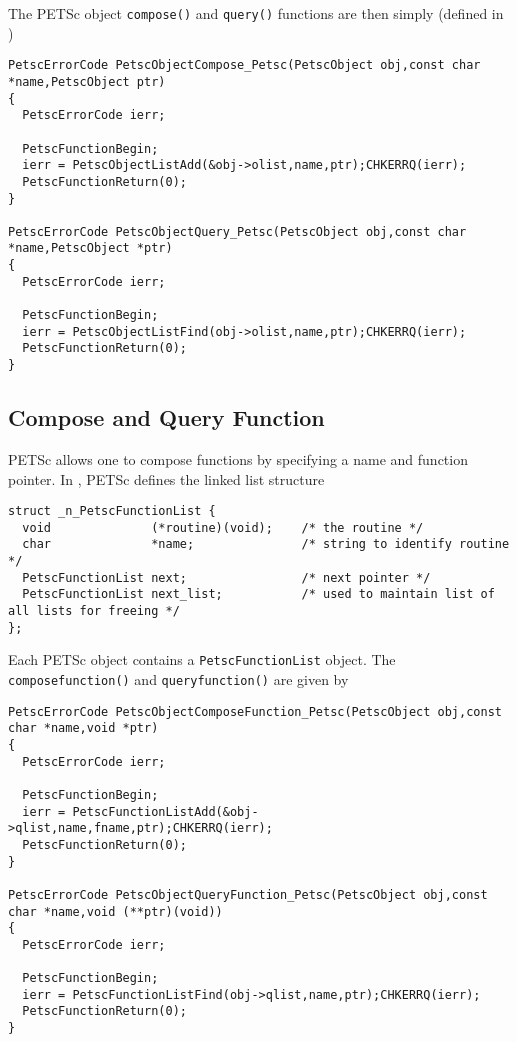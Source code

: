 The PETSc object \lstinline{compose()} and \lstinline{query()} functions are then simply
(defined in \href{http://www.mcs.anl.gov/petsc/petsc-master/src/objects/inherit.c.html}{})
\begin{lstlisting}
PetscErrorCode PetscObjectCompose_Petsc(PetscObject obj,const char *name,PetscObject ptr)
{
  PetscErrorCode ierr;

  PetscFunctionBegin;
  ierr = PetscObjectListAdd(&obj->olist,name,ptr);CHKERRQ(ierr);
  PetscFunctionReturn(0);
}

PetscErrorCode PetscObjectQuery_Petsc(PetscObject obj,const char *name,PetscObject *ptr)
{
  PetscErrorCode ierr;

  PetscFunctionBegin;
  ierr = PetscObjectListFind(obj->olist,name,ptr);CHKERRQ(ierr);
  PetscFunctionReturn(0); 
}
\end{lstlisting}

\subsection{Compose and Query Function}

PETSc allows one to compose functions by specifying a name and function pointer. 
In \href{http://www.mcs.anl.gov/petsc/petsc-master/src/sys/dll/reg.c.html}{},
PETSc defines the linked list structure

\begin{lstlisting}
struct _n_PetscFunctionList {
  void              (*routine)(void);    /* the routine */
  char              *name;               /* string to identify routine */
  PetscFunctionList next;                /* next pointer */
  PetscFunctionList next_list;           /* used to maintain list of all lists for freeing */
};
\end{lstlisting}

Each PETSc object contains a \lstinline{PetscFunctionList} object. 
The \lstinline{composefunction()} and \lstinline{queryfunction()} are given by

\begin{lstlisting}
PetscErrorCode PetscObjectComposeFunction_Petsc(PetscObject obj,const char *name,void *ptr)
{
  PetscErrorCode ierr;

  PetscFunctionBegin;
  ierr = PetscFunctionListAdd(&obj->qlist,name,fname,ptr);CHKERRQ(ierr);
  PetscFunctionReturn(0);
}

PetscErrorCode PetscObjectQueryFunction_Petsc(PetscObject obj,const char *name,void (**ptr)(void))
{
  PetscErrorCode ierr;

  PetscFunctionBegin;
  ierr = PetscFunctionListFind(obj->qlist,name,ptr);CHKERRQ(ierr);
  PetscFunctionReturn(0);
}
\end{lstlisting}

